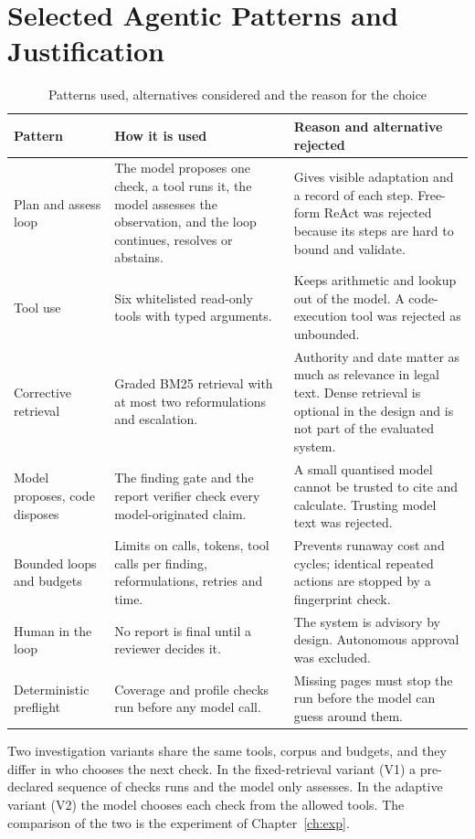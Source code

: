 \section{Selected Agentic Patterns and Justification}
\label{sec:patterns}
\begin{table}[H]
\centering
\caption{Patterns used, alternatives considered and the reason for the choice}
\label{tab:patterns}
\small
\begin{tabularx}{\linewidth}{@{}p{3.1cm} X X@{}}
\toprule
\textbf{Pattern} & \textbf{How it is used} & \textbf{Reason and alternative rejected} \\ \midrule
Plan and assess loop & The model proposes one check, a tool runs it, the model assesses the observation, and the loop continues, resolves or abstains. & Gives visible adaptation and a record of each step. Free-form ReAct was rejected because its steps are hard to bound and validate. \\
Tool use & Six whitelisted read-only tools with typed arguments. & Keeps arithmetic and lookup out of the model. A code-execution tool was rejected as unbounded. \\
Corrective retrieval & Graded BM25 retrieval with at most two reformulations and escalation. & Authority and date matter as much as relevance in legal text. Dense retrieval is optional in the design and is not part of the evaluated system. \\
Model proposes, code disposes & The finding gate and the report verifier check every model-originated claim. & A small quantised model cannot be trusted to cite and calculate. Trusting model text was rejected. \\
Bounded loops and budgets & Limits on calls, tokens, tool calls per finding, reformulations, retries and time. & Prevents runaway cost and cycles; identical repeated actions are stopped by a fingerprint check. \\
Human in the loop & No report is final until a reviewer decides it. & The system is advisory by design. Autonomous approval was excluded. \\
Deterministic preflight & Coverage and profile checks run before any model call. & Missing pages must stop the run before the model can guess around them. \\
\bottomrule
\end{tabularx}
\end{table}

Two investigation variants share the same tools, corpus and budgets, and they differ in who chooses the
next check. In the fixed-retrieval variant (V1) a pre-declared sequence of checks runs and the model only
assesses. In the adaptive variant (V2) the model chooses each check from the allowed tools. The comparison of
the two is the experiment of Chapter~\ref{ch:exp}.

